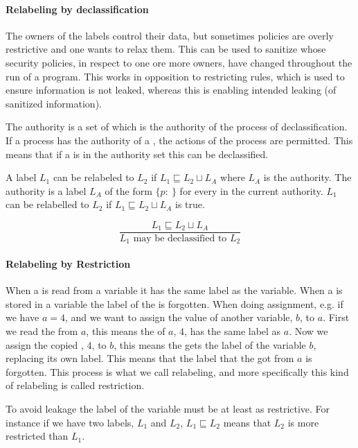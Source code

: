 \paragraph{Relabeling by declassification}
The owners of the labels control their data, but sometimes policies are overly restrictive and one wants to relax them.
This can be used to sanitize \xvalues{} whose security policies, in respect to one ore more owners, have changed throughout the run of a program.
This works in opposition to restricting rules, which is used to ensure information is not leaked, whereas this is enabling intended leaking (of sanitized information).

The authority is a set of \principals{} which is the authority of the process of declassification.
If a process has the authority of a \principal{}, the actions of the process are permitted.
This means that if a \principal{} is in the authority set this can be declassified.

\begin{definition}
  A label $L_1$ can be relabeled to $L_2$ if $L_1 \sqsubseteq L_2 \sqcup L_A$ where $L_A$ is the authority.
  The authority is a label $L_A$ of the form $\{p: \ \}$ for every \principal{} in the current authority.
  $L_1$ can be relabelled to $L_2$ if $L_1 \sqsubseteq L_2 \sqcup L_A$ is true.
  \begin{center}
    \[\frac{L_1 \sqsubseteq L_2 \sqcup L_A}{L_1 \text{ may be declassified to } L_2}\]    
  \end{center}
\end{definition}

\paragraph{Relabeling by Restriction}
When a \xvalue{} is read from a variable it has the same label as the variable.
When a \xvalue{} is stored in a variable the label of the \xvalue{} is forgotten.
When doing assignment, e.g. if we have $a = 4$, and we want to assign the value of another variable, $b$, to $a$.
First we read the \xvalue{} from $a$, this means the \xvalue{} of $a$, $4$, has the same label as $a$.
Now we assign the copied \xvalue{}, $4$, to $b$, this means the \xvalue{} gets the label of the variable $b$, replacing its own label.
This means that the label that the \xvalue{} got from $a$ is forgotten.
This process is what we call relabeling, and more specifically this kind of relabeling is called restriction.

To avoid leakage the label of the variable must be at least as restrictive.
For instance if we have two labels, $L_1$ and $L_2$, $L_1 \sqsubseteq L_2$ means that $L_2$ is more restricted than $L_1$.

